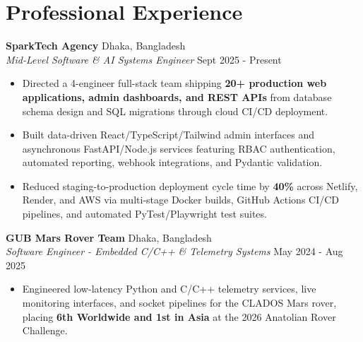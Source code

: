 \documentclass[9.5pt,a4paper]{article}
\begin{document}
\section*{Professional Experience}
\noindent
\textbf{SparkTech Agency} \hfill Dhaka, Bangladesh\\
\textit{Mid-Level Software \& AI Systems Engineer} \hfill Sept 2025 - Present
\begin{itemize}
    \item Directed a 4-engineer full-stack team shipping \textbf{20+ production web applications, admin dashboards, and REST APIs} from database schema design and SQL migrations through cloud CI/CD deployment.
    \item Built data-driven React/TypeScript/Tailwind admin interfaces and asynchronous FastAPI/Node.js services featuring RBAC authentication, automated reporting, webhook integrations, and Pydantic validation.
    \item Reduced staging-to-production deployment cycle time by \textbf{40\%} across Netlify, Render, and AWS via multi-stage Docker builds, GitHub Actions CI/CD pipelines, and automated PyTest/Playwright test suites.
\end{itemize}
\vspace{0.6pt}
\noindent
\textbf{GUB Mars Rover Team} \hfill Dhaka, Bangladesh\\
\textit{Software Engineer - Embedded C/C++ \& Telemetry Systems} \hfill May 2024 - Aug 2025
\begin{itemize}
    \item Engineered low-latency Python and C/C++ telemetry services, live monitoring interfaces, and socket pipelines for the CLADOS Mars rover, placing \textbf{6th Worldwide and 1st in Asia} at the 2026 Anatolian Rover Challenge.
\end{itemize}
\vspace{0.6pt}
\end{document}
